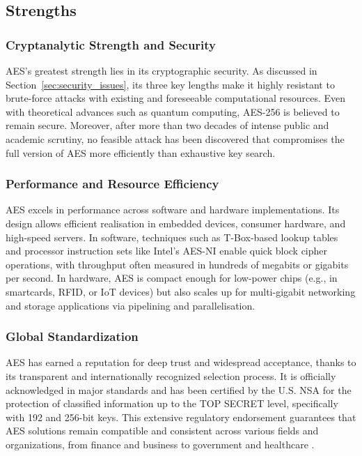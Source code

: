 \subsection{Strengths}

\subsubsection*{Cryptanalytic Strength and Security}

AES's greatest strength lies in its cryptographic security. 
As discussed in Section~\ref{sec:security_issues}, its three key lengths make it highly resistant to brute-force attacks with existing and foreseeable computational resources. 
Even with theoretical advances such as quantum computing, AES-256 is believed to remain secure. 
Moreover, after more than two decades of intense public and academic scrutiny, no feasible attack has been discovered that compromises the full version of AES more efficiently than exhaustive key search.

\subsubsection*{Performance and Resource Efficiency}

AES excels in performance across software and hardware implementations. 
Its design allows efficient realisation in embedded devices, consumer hardware, and high-speed servers. 
In software, techniques such as T-Box-based lookup tables and processor instruction sets like Intel's AES-NI enable quick block cipher operations, with throughput often measured in hundreds of megabits or gigabits per second. 
In hardware, AES is compact enough for low-power chips (e.g., in smartcards, \Gls{RFID}, or \Gls{IoT} devices) but also scales up for multi-gigabit networking and storage applications via pipelining and parallelisation.

\subsubsection*{Global Standardization}

AES has earned a reputation for deep trust and widespread acceptance, thanks to its transparent and internationally recognized selection process. 
It is officially acknowledged in major standards and has been certified by the U.S. NSA for the protection of classified information up to the TOP SECRET level, specifically with 192 and 256-bit keys. 
This extensive regulatory endorsement guarantees that AES solutions remain compatible and consistent across various fields and organizations, from finance and business to government and healthcare \cite{cooper2025aes}.